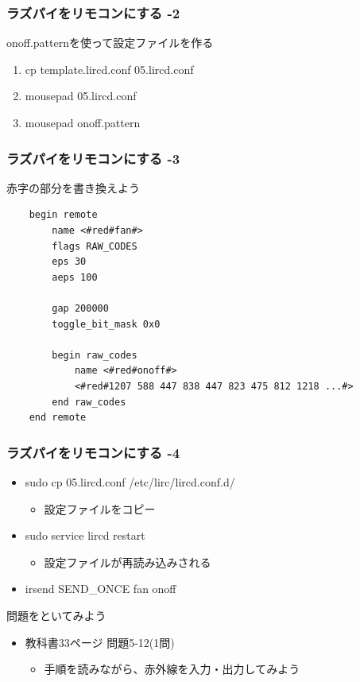 \documentclass[slide05.tex]{subfiles}
\begin{document}
\begin{frame}
    \frametitle{ラズパイをリモコンにする -2} 
    onoff.patternを使って設定ファイルを作る
    \begin{enumerate}
        \item cp template.lircd.conf 05.lircd.conf
        \item mousepad 05.lircd.conf
        \item mousepad onoff.pattern
    \end{enumerate}
\end{frame}

\begin{frame}[fragile]
    \frametitle{ラズパイをリモコンにする -3}
    赤字の部分を書き換えよう
    \begin{lstlisting}
    begin remote
        name <#red#fan#>
        flags RAW_CODES
        eps 30
        aeps 100

        gap 200000
        toggle_bit_mask 0x0
    
        begin raw_codes
            name <#red#onoff#>
            <#red#1207 588 447 838 447 823 475 812 1218 ...#>
        end raw_codes
    end remote
    \end{lstlisting}
\end{frame}

\begin{frame}
    \frametitle{ラズパイをリモコンにする -4}
    \begin{itemize}
        \item sudo cp 05.lircd.conf /etc/lirc/lircd.conf.d/
        \begin{itemize}
            \item 設定ファイルをコピー
        \end{itemize}
        \item sudo service lircd restart
        \begin{itemize}
            \item 設定ファイルが再読み込みされる
        \end{itemize}
        \item irsend SEND\_ONCE \color{red}fan onoff\color{black}
    \end{itemize}
\end{frame}

\begin{frame}
    \begin{exampleblock}{問題をといてみよう}
    \begin{itemize}
        \item 教科書33ページ 問題5-12(1問)
        \begin{itemize}
            \item 手順を読みながら、赤外線を入力・出力してみよう
        \end{itemize}
    \end{itemize}
    \end{exampleblock}
\end{frame}
\end{document}

